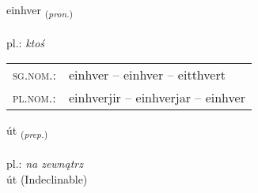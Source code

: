 \documentclass[frontgrid, backgrid]{flacards}\usepackage[]{graphicx}\usepackage[]{xcolor}
\begin{document}
\renewcommand{\blhead}{\vskip5pt {\small\bfseries\footnotesize Fornafn | Pronoun }}
\renewcommand{\bcfoot}{\vskip5pt \hspace{2pt}{\small\bfseries\footnotesize 1K}}


{einhver \small{\textsubscript{(\textit{pron.})}} \\[1ex] %
 \\
pl.: \emph{ktoś} \\  [2ex]
\renewcommand*{\arraystretch}{0.8}
\begin{tabular}{ll}
\textsc{sg.nom.}: & einhver  --  einhver -- eitthvert \\ 
\textsc{pl.nom.}: & einhverjir -- einhverjar -- einhver
\end{tabular}
}


\renewcommand{\flhead}{\vskip5pt \fboxsep=0pt {\small\bfseries\footnotesize Forsetning | Preposition}}
\renewcommand{\fcfoot}{\vskip5pt \fboxsep=0pt \hspace{2pt}{\small\bfseries\footnotesize 1K}}

\renewcommand{\blhead}{\vskip5pt {\small\bfseries\footnotesize Forsetning | Preposition }}
\renewcommand{\bcfoot}{\vskip5pt \hspace{2pt}{\small\bfseries\footnotesize 1K}}


{út \small{\textsubscript{(\textit{prep.})}} \\[1ex]
\textphonetic{[uːt]} \\
pl.: \emph{na zewnątrz} \\  [2ex]
út (Indeclinable)}

\renewcommand{\flhead}{\vskip5pt \fboxsep=0pt {\small\bfseries\footnotesize Sagnorð | Verb}}
\renewcommand{\fcfoot}{\vskip5pt \fboxsep=0pt \hspace{2pt}{\small\bfseries\footnotesize 1K}}

\renewcommand{\blhead}{\vskip5pt {\small\bfseries\footnotesize Sagnorð | Verb }}
\renewcommand{\bcfoot}{\vskip5pt \hspace{2pt}{\small\bfseries\footnotesize 1K}}
\end{document}
